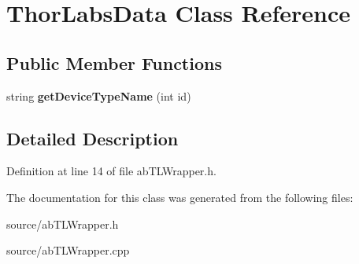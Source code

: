 \hypertarget{class_thor_labs_data}{}\section{Thor\+Labs\+Data Class Reference}
\label{class_thor_labs_data}
\subsection*{Public Member Functions}
\begin{DoxyCompactItemize}
\item 
string {\bfseries get\+Device\+Type\+Name} (int id)\hypertarget{class_thor_labs_data_a88fe2eb9ffdafbc7779a665fd0231a80}{}\label{class_thor_labs_data_a88fe2eb9ffdafbc7779a665fd0231a80}

\end{DoxyCompactItemize}


\subsection{Detailed Description}


Definition at line 14 of file ab\+T\+L\+Wrapper.\+h.



The documentation for this class was generated from the following files\+:\begin{DoxyCompactItemize}
\item 
source/ab\+T\+L\+Wrapper.\+h\item 
source/ab\+T\+L\+Wrapper.\+cpp\end{DoxyCompactItemize}
